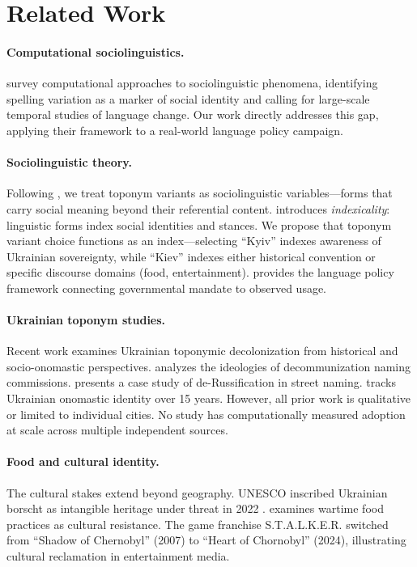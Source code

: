 \documentclass{article}
\begin{document}
\section{Related Work}
\label{sec:related}

\paragraph{Computational sociolinguistics.} \citet{nguyen-etal-2016-survey} survey computational approaches to sociolinguistic phenomena, identifying spelling variation as a marker of social identity and calling for large-scale temporal studies of language change. Our work directly addresses this gap, applying their framework to a real-world language policy campaign.

\paragraph{Sociolinguistic theory.} Following \citet{labov-1966}, we treat toponym variants as sociolinguistic variables---forms that carry social meaning beyond their referential content. \citet{eckert-2008} introduces \textit{indexicality}: linguistic forms index social identities and stances. We propose that toponym variant choice functions as an index---selecting ``Kyiv'' indexes awareness of Ukrainian sovereignty, while ``Kiev'' indexes either historical convention or specific discourse domains (food, entertainment). \citet{spolsky-2004} provides the language policy framework connecting governmental mandate to observed usage.

\paragraph{Ukrainian toponym studies.} Recent work examines Ukrainian toponymic decolonization from historical and socio-onomastic perspectives. \citet{toponymic-decom-2025} analyzes the ideologies of decommunization naming commissions. \citet{derussification-hodonyms-2023} presents a case study of de-Russification in street naming. \citet{onomastic-identity-2023} tracks Ukrainian onomastic identity over 15 years. However, all prior work is qualitative or limited to individual cities. No study has computationally measured adoption at scale across multiple independent sources.

\paragraph{Food and cultural identity.} The cultural stakes extend beyond geography. UNESCO inscribed Ukrainian borscht as intangible heritage under threat in 2022 \citep{unesco-borscht}. \citet{varypaiev-2025} examines wartime food practices as cultural resistance. The game franchise S.T.A.L.K.E.R. switched from ``Shadow of Chernobyl'' (2007) to ``Heart of Chornobyl'' (2024), illustrating cultural reclamation in entertainment media.
\end{document}
